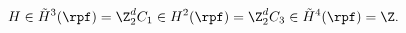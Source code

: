 \begin{equation}
H\in \tilde{H}^3(\rpf)=\Z_2\sp
dC_1\in H^2(\rpf)=\Z_2\sp
dC_3\in \tilde{H}^4(\rpf)=\Z.
\end{equation}

